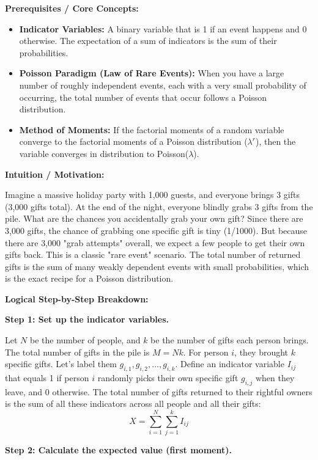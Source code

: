 \begin{solution}
\textbf{Prerequisites / Core Concepts:}
\begin{itemize}
    \item \textbf{Indicator Variables:} A binary variable that is 1 if an event happens and 0 otherwise. The expectation of a sum of indicators is the sum of their probabilities.
    \item \textbf{Poisson Paradigm (Law of Rare Events):} When you have a large number of roughly independent events, each with a very small probability of occurring, the total number of events that occur follows a Poisson distribution.
    \item \textbf{Method of Moments:} If the factorial moments of a random variable converge to the factorial moments of a Poisson distribution ($\lambda^r$), then the variable converges in distribution to Poisson($\lambda$).
\end{itemize}

\textbf{Intuition / Motivation:}

Imagine a massive holiday party with 1,000 guests, and everyone brings 3 gifts (3,000 gifts total). At the end of the night, everyone blindly grabs 3 gifts from the pile. What are the chances you accidentally grab your own gift? Since there are 3,000 gifts, the chance of grabbing one specific gift is tiny (1/1000). But because there are 3,000 "grab attempts" overall, we expect a few people to get their own gifts back. This is a classic "rare event" scenario. The total number of returned gifts is the sum of many weakly dependent events with small probabilities, which is the exact recipe for a Poisson distribution.

\textbf{Logical Step-by-Step Breakdown:}

\textbf{Step 1: Set up the indicator variables.}

Let $N$ be the number of people, and $k$ be the number of gifts each person brings.
The total number of gifts in the pile is $M = Nk$.
For person $i$, they brought $k$ specific gifts. Let's label them $g_{i,1}, g_{i,2}, \dots, g_{i,k}$.
Define an indicator variable $I_{ij}$ that equals 1 if person $i$ randomly picks their own specific gift $g_{i,j}$ when they leave, and 0 otherwise.
The total number of gifts returned to their rightful owners is the sum of all these indicators across all people and all their gifts:
\[ X = \sum_{i=1}^N \sum_{j=1}^k I_{ij} \]

\textbf{Step 2: Calculate the expected value (first moment).}


\end{solution}

